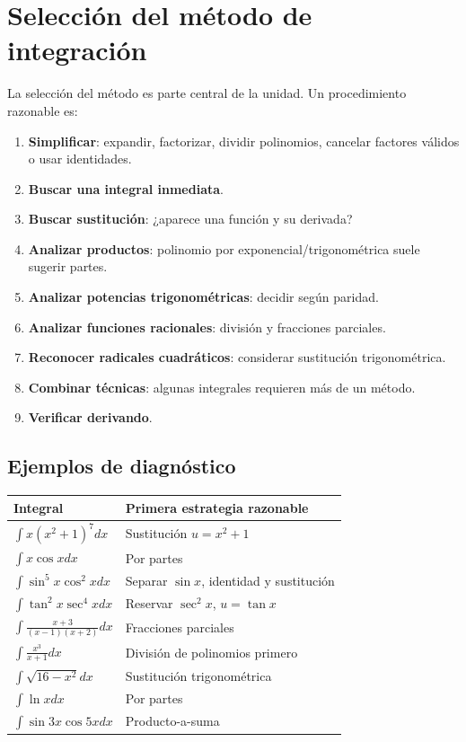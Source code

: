 \documentclass[12pt]{article}
\theoremstyle{definition}
\theoremstyle{remark}
\begin{document}
\section{Selección del método de integración}
La selección del método es parte central de la unidad. Un procedimiento razonable es:
\begin{enumerate}
\item \textbf{Simplificar}: expandir, factorizar, dividir polinomios, cancelar factores válidos o usar identidades.
\item \textbf{Buscar una integral inmediata}.
\item \textbf{Buscar sustitución}: ¿aparece una función y su derivada?
\item \textbf{Analizar productos}: polinomio por exponencial/trigonométrica suele sugerir partes.
\item \textbf{Analizar potencias trigonométricas}: decidir según paridad.
\item \textbf{Analizar funciones racionales}: división y fracciones parciales.
\item \textbf{Reconocer radicales cuadráticos}: considerar sustitución trigonométrica.
\item \textbf{Combinar técnicas}: algunas integrales requieren más de un método.
\item \textbf{Verificar derivando}.
\end{enumerate}
\subsection*{Ejemplos de diagnóstico}
\begin{center}\begin{longtable}{p{}p{}}\toprule
Integral & Primera estrategia razonable\\\midrule
$\int x(x^2+1)^7dx$ & Sustitución $u=x^2+1$\\
$\int x\cos xdx$ & Por partes\\
$\int\sin^5x\cos^2xdx$ & Separar $\sin x$, identidad y sustitución\\
$\int\tan^2x\sec^4xdx$ & Reservar $\sec^2x$, $u=\tan x$\\
$\int\frac{x+3}{(x-1)(x+2)}dx$ & Fracciones parciales\\
$\int\frac{x^3}{x+1}dx$ & División de polinomios primero\\
$\int\sqrt{16-x^2}dx$ & Sustitución trigonométrica\\
$\int\ln xdx$ & Por partes\\
$\int\sin3x\cos5xdx$ & Producto-a-suma\\\bottomrule
\end{longtable}\end{center}
\end{document}
